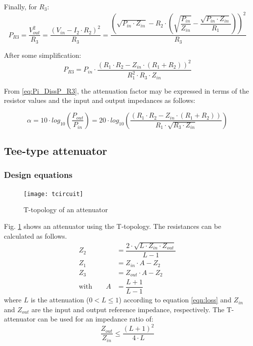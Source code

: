 \noindent Finally, for $R_{3}$:
\begin{equation}
P_{R3} = \dfrac{V_{out}^2}{R_{3}} = \dfrac{(V_{in} - I_{2} \cdot R_{2})^2}{R_{3}} = \dfrac{\left( \sqrt{P_{in} \cdot Z_{in}} - R_{2}\cdot\left( \sqrt{\dfrac{P_{in}}{Z_{in}}} - \dfrac{\sqrt{P_{in} \cdot Z_{in}}}{R_{1}}\right) \right)^2}{R_{3}}
\end{equation}

\noindent After some simplification:
\begin{equation}
P_{R3} = P_{in} \cdot \dfrac{(R_{1} \cdot R_{2} - Z_{in} \cdot (R_{1} + R_{2}))^2}{R_{1}^2 \cdot R_{3} \cdot Z_{in}}
\label{eq:Pi_DissP_R3}
\end{equation}

\noindent From  \ref{eq:Pi_DissP_R3}, the attenuation factor may be expressed in terms of the resistor values and the input and output impedances as follows:

\begin{equation}
\alpha = 10\cdot log_{10} \left( \dfrac{P_{out}}{P_{in}}\right) = 20\cdot log_{10} \left( \dfrac{(R_{1} \cdot R_{2} - Z_{in} \cdot (R_{1} + R_{2}))}{R_{1} \cdot \sqrt{ R_{3} \cdot Z_{in}}} \right)
\end{equation}

\clearpage
\subsection{Tee-type attenuator}
\subsubsection{Design equations}

\begin{figure}[ht]
\begin{center}
\texttt{[image: tcircuit]}
\end{center}
\caption{T-topology of an attenuator}
\label{fig:t_attenuator}
\end{figure}
\FloatBarrier

Fig. \ref{fig:t_attenuator} shows an attenuator using the
T-topology. The resistances can be calculated as follows.
\begin{align}
Z_2 & = \dfrac{2\cdot \sqrt{L\cdot Z_{in}\cdot Z_{out}}}{L - 1} \\
Z_1 & = Z_{in}\cdot A - Z_2 \\
Z_3 & = Z_{out}\cdot A - Z_2 \\
\textrm{with} \qquad A & = \dfrac{L + 1}{L - 1}
\end{align}
where $L$ is the attenuation ($0 < L\le 1$) according to
equation \ref{eqn:loss} and $Z_{in}$ and $Z_{out}$
are the input and output reference impedance, respectively.
The T-attenuator can be used for an impedance ratio of:
\begin{equation}
\dfrac{Z_{out}}{Z_{in}} \le \dfrac{(L+1)^2}{4\cdot L}
\end{equation}

